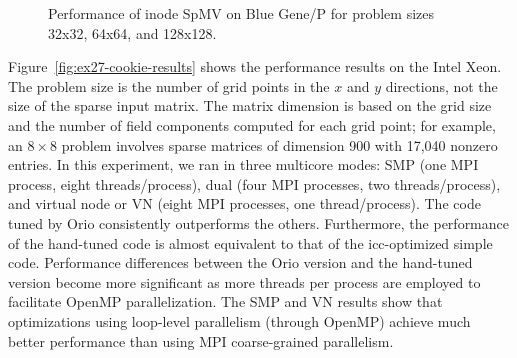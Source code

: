 {\begin{figure}
\begin{center}
{  \label{fig:ex27-bgp-vn-64x64} 
  } 
\end{center}
\caption{Performance of inode SpMV on Blue Gene/P for problem sizes 32x32, 64x64, and 128x128.} 
\label{fig:ex27-bgp-results2} 
\end{figure} 
}



Figure~\ref{fig:ex27-cookie-results} shows the performance results on the
Intel Xeon. The problem size is the number of grid points in the $x$ and $y$
directions, not the size of the sparse input matrix. The matrix dimension is
based on the grid size and the number of field components computed for each grid
point; for example, an $8 \times 8$ problem involves sparse matrices of
dimension 900 with 17,040 nonzero entries. In this experiment, we ran in
three multicore modes: SMP (one MPI process, eight
threads/process), dual (four MPI processes, two threads/process), and virtual
node or VN (eight MPI processes, one thread/process). The code tuned by Orio
consistently outperforms the others. Furthermore, the performance of
the hand-tuned code is almost equivalent to that of the icc-optimized simple
code. Performance differences between the Orio version and the hand-tuned
version become more significant as more threads per process are employed to
facilitate OpenMP parallelization. The SMP and VN results show that
optimizations using loop-level parallelism (through OpenMP) achieve much
better performance than using MPI coarse-grained parallelism.

